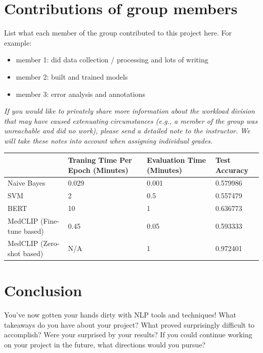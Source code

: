 \documentclass[11pt,a4paper]{article}
\begin{document}
\section{Contributions of group members}
List what each member of the group contributed to this project here. For example: 
\begin{itemize}
    \item member 1: did data collection / processing and lots of writing
    \item member 2: built and trained models
    \item member 3: error analysis and annotations
\end{itemize}

\textit{ \color{blue} If you would like to privately share more information about the workload division that may have caused extenuating circumstances (e.g., a member of the group was unreachable and did no work), please send a detailed note to the instructor. We will take these notes into account when assigning individual grades.}


\begin{table}
\begin{center}
\begin{tabular}{|l|l|l|l|}
\hline
                          & Traning Time Per Epoch (Minutes) & Evaluation Time (Minutes) & Test Accuracy \\ \hline
Naive Bayes               & 0.029                            & 0.001                     & 0.579986      \\ \hline
SVM                       & 2                                & 0.5                       & 0.557479      \\ \hline
BERT                      & 10                               & 1                         & 0.636773      \\ \hline
MedCLIP (Fine-tune based) & 0.45                             & 0.05                      & 0.593333      \\ \hline
MedCLIP (Zero-shot based) & N/A                              & 1                         & 0.972401      \\ \hline
\end{tabular}
\end{center}
\end{table}


\section{Conclusion}
You've now gotten your hands dirty with NLP tools and techniques! What takeaways do you have about your project? What proved surprisingly difficult to accomplish? Were your surprised by your results? If you could continue working on your project in the future, what directions would you pursue?



\footnotesize

\end{document}
